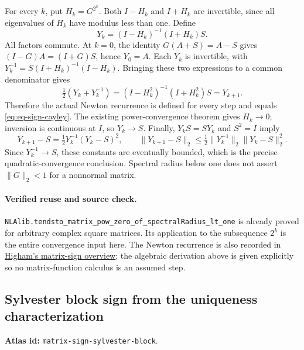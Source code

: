 \documentclass[11pt,a4paper]{article}
\DeclareRobustCommand{\code}[1]{{\footnotesize\urlstyle{tt}\nolinkurl{#1}}}
\begin{document}
For every $k$, put $H_k=G^{2^k}$. Both $I-H_k$ and $I+H_k$ are
invertible, since all eigenvalues of $H_k$ have modulus less than one.
Define
\begin{equation}\label{eq:eq-sign-cayley}
 Y_k=(I-H_k)^{-1}(I+H_k)S.
\end{equation}
All factors commute. At $k=0$, the identity
$G(A+S)=A-S$ gives $(I-G)A=(I+G)S$, hence $Y_0=A$.
Each $Y_k$ is invertible, with
$Y_k^{-1}=S(I+H_k)^{-1}(I-H_k)$. Bringing these two expressions to
a common denominator gives
\[
 \tfrac12(Y_k+Y_k^{-1})
 =(I-H_k^2)^{-1}(I+H_k^2)S=Y_{k+1}.
\]
Therefore the actual Newton recurrence is defined for every step and
equals \eqref{eq:eq-sign-cayley}. The existing power-convergence theorem
gives $H_k\to0$; inversion is continuous at $I$, so $Y_k\to S$.
Finally, $Y_kS=SY_k$ and $S^2=I$ imply
\[
 Y_{k+1}-S=\tfrac12Y_k^{-1}(Y_k-S)^2,
 \qquad
 \|Y_{k+1}-S\|_2\le\tfrac12\|Y_k^{-1}\|_2\|Y_k-S\|_2^2.
\]
Since $Y_k^{-1}\to S$, these constants are eventually bounded, which
is the precise quadratic-convergence conclusion. Spectral radius below
one does not assert $\|G\|_2<1$ for a nonnormal matrix.

\paragraph{Verified reuse and source check.}
\code{NLAlib.tendsto_matrix_pow_zero_of_spectralRadius_lt_one} is
already proved for arbitrary complex square matrices. Its application
to the subsequence $2^k$ is the entire convergence input here.
The Newton recurrence is also recorded in
\href{https://nhigham.com/2020/12/15/what-is-the-matrix-sign-function/}
{Higham's matrix-sign overview}; the algebraic derivation above is
given explicitly so no matrix-function calculus is an assumed step.

\subsection{Sylvester block sign from the uniqueness characterization}
\label{sec:eq-sign-sylvester}
\textbf{Atlas id:} \code{matrix-sign-sylvester-block}.
\end{document}
